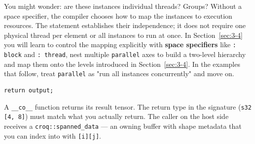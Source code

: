 You might wonder: are these instances individual threads? Groups? Without a space specifier, the compiler chooses how to map the instances to execution resources. The statement establishes their independence; it does not require one physical thread per element or all instances to run at once. In Section~\ref{sec:3-4} you will learn to control the mapping explicitly with \textbf{space specifiers} like \texttt{: block} and \texttt{: thread}, nest multiple \texttt{parallel} axes to build a two-level hierarchy and map them onto the levels introduced in Section~\ref{sec:3-4}. In the examples that follow, treat \texttt{parallel} as "run all instances concurrently" and move on.

\begin{lstlisting}[language=croqtile,caption={Returning the result}]
return output;
\end{lstlisting}

A \texttt{\_\_co\_\_} function returns its result tensor. The return type in the signature (\texttt{s32 [4, 8]}) must match what you actually return. The caller on the host side receives a \texttt{croq:\allowbreak{}:\allowbreak{}spanned\_\allowbreak{}data} --- an owning buffer with shape metadata that you can index into with \texttt{[i][j]}.
